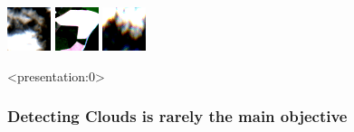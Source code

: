 \documentclass[%
  aspectratio=169,
  9pt,
ngerman,
  light,
  mathserif,
  professionalfont,
  affiliationintitlepagehead,
  titlegraphic,
   affiliation,
   navigationbar,
  progressbar,
]{beamer}
\begin{document}
\begin{frame}
	\includegraphics[width=\imagewidth]{images/activations/16494/x/x-31.png}
	\includegraphics[width=\imagewidth]{images/activations/16494/x/x-32.png}
	\includegraphics[width=\imagewidth]{images/activations/16494/x/x-33.png}
%	
\end{frame}
%

%		




\begin{frame}<presentation:0>

\frametitle{Detecting Clouds is rarely the main objective}
\LARGE
\centering\figcloudfilteringpipeline

\end{frame}

%


%
%

%
%
%
%
%
\end{document}
